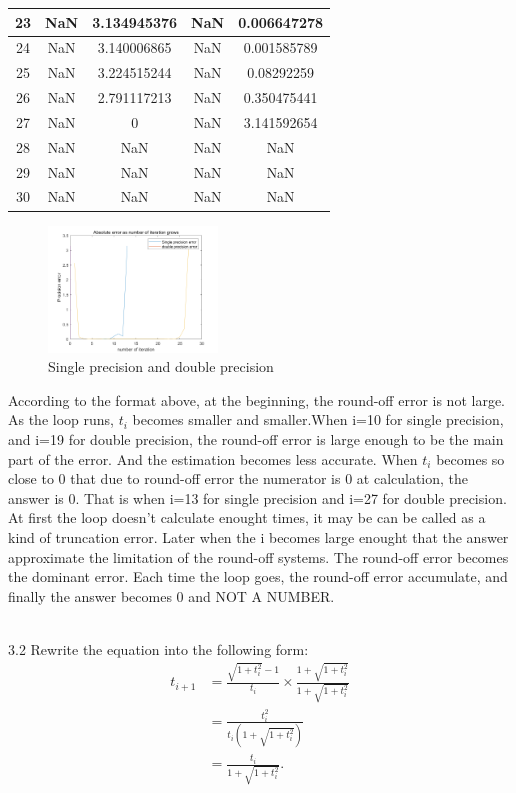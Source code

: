 \documentclass{article}
\begin{document}
\begin{center}
\begin{longtable}{|c|c|c|c|c|}
23	&	NaN	&	3.134945376	&	NaN	&	0.006647278	\\ \hline
24	&	NaN	&	3.140006865	&	NaN	&	0.001585789	\\ \hline
25	&	NaN	&	3.224515244	&	NaN	&	0.08292259	\\ \hline
26	&	NaN	&	2.791117213	&	NaN	&	0.350475441	\\ \hline
27	&	NaN	&	0	&	NaN	&	3.141592654	\\ \hline
28	&	NaN	&	NaN	&	NaN	&	NaN	\\ \hline
29	&	NaN	&	NaN	&	NaN	&	NaN	\\ \hline
30	&	NaN	&	NaN	&	NaN	&	NaN	\\ \hline



\end{longtable}
\end{center}
\begin{figure}[H]
\centering
\includegraphics[width=0.4\textwidth,height=0.3\textwidth]{precision.png}
\caption{Single precision and double precision}
\end{figure}
According to the format above, at the beginning, the round-off error is not large. As the loop runs, $t_{i}$ becomes smaller and smaller.When i=10 for single precision, and i=19 for double precision, the round-off error is large enough to be the main part of the error. And the estimation becomes less accurate. When $t_{i}$ becomes so close to 0 that due to round-off error the numerator is 0 at calculation, the answer is 0. That is when i=13 for single precision and i=27 for double precision.\\
At first the loop doesn't calculate enought times, it may be can be called as a kind of truncation error. Later when the i becomes large enought that the answer approximate the limitation of the round-off systems. The round-off error becomes the dominant error. Each time the loop goes, the round-off error accumulate, and finally the answer becomes 0 and NOT A NUMBER.\par
~\\
3.2
Rewrite the equation into the following form:
\begin{equation}
\begin{split}
t_{i+1}&=\frac{\sqrt{1+t_{i}^{2}}-1}{t_{i}}\times\frac{1+\sqrt{1+t_{i}^{2}}}{1+\sqrt{1+t_{i}^{2}}}\\
&=\frac{t_{i}^{2}}{t_{i}\left(1+\sqrt{1+t_{i}^{2}}\right)}\\
&=\frac{t_{i}}{1+\sqrt{1+t_{i}^{2}}}.
\end{split}
\end{equation}
\end{document}

